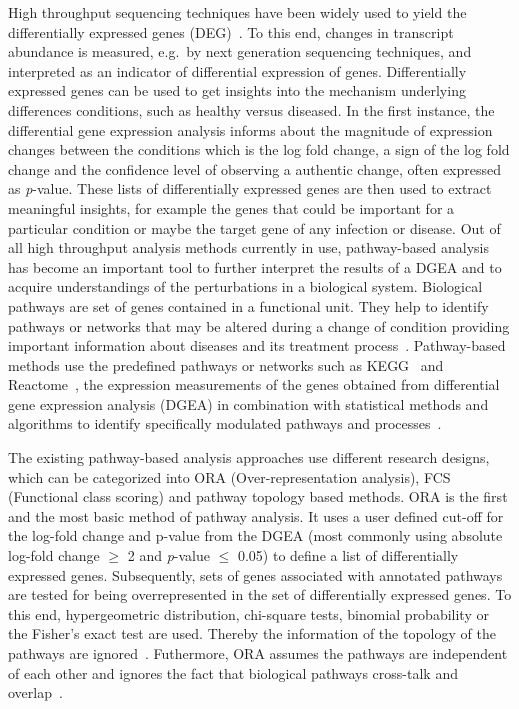 \documentclass[twocolumn]{article}
\begin{document}
High throughput sequencing techniques have been widely used to yield
the differentially expressed genes (DEG)~\cite{DEG}. To this end,
changes in transcript abundance is measured, e.g.~by next generation
sequencing techniques, and interpreted as an indicator of differential
expression of genes. Differentially expressed genes can be used to get
insights into the mechanism underlying differences conditions, such as
healthy versus diseased. In the first instance, the differential gene
expression analysis informs about the magnitude of expression changes
between the conditions which is the log fold change, a sign of the log fold change and the confidence level
of observing a authentic change, often expressed as
\textit{p}-value. These lists of differentially expressed genes are
then used to extract meaningful insights, for example the genes that
could be important for a particular condition or maybe the target gene
of any infection or disease. Out of all high throughput analysis
methods currently in use, pathway-based analysis has become an
important tool to further interpret the results of a DGEA and to
acquire understandings of the perturbations in a biological
system. Biological pathways are set of genes contained in a functional
unit. They help to identify pathways or networks that may be altered
during a change of condition providing important information about
diseases and its treatment process~\cite{Khatri2012}. Pathway-based
methods use the predefined pathways or networks such as
KEGG~\cite{Kegg} and Reactome~\cite{Reactome}, the expression
measurements of the genes obtained from differential gene expression
analysis (DGEA) in combination with statistical methods and algorithms to
identify specifically modulated pathways and processes~\cite{Campos}.

The existing pathway-based analysis approaches use different research
designs, which can be categorized into ORA (Over-representation
analysis), FCS (Functional class scoring) and pathway topology based
methods. ORA is the first and the most basic method of pathway
analysis. It uses a user defined cut-off for the log-fold change and
p-value from the DGEA (most commonly using absolute log-fold change
$\geq$ 2 and \textit{p}-value $\leq$ 0.05) to define a list of
differentially expressed genes. Subsequently, sets of genes associated
with annotated pathways are tested for being overrepresented in the
set of differentially expressed genes. To this end, hypergeometric
distribution, chi-square tests, binomial probability or the Fisher’s
exact test are used. Thereby the information of the topology of the
pathways are ignored~\cite{Bayer}. Futhermore, ORA assumes the
pathways are independent of each other and ignores the fact that
biological pathways cross-talk and overlap~\cite{Khatri2012,Campos}.
\end{document}
